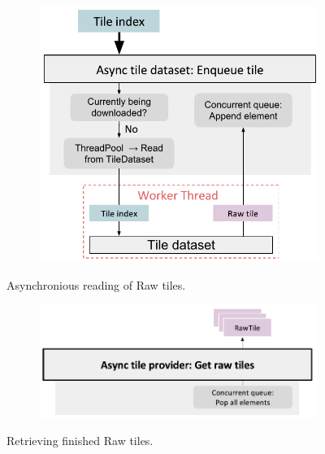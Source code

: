\begin{figure}[htbp]
    \centering
    \begin{subfigure}[bt]{0.6\textwidth}
        \includegraphics[width=\textwidth]{figures/implementation/pipeline/asynctiledataset.pdf}
    \end{subfigure}
    \caption{Asynchronious reading of Raw tiles.}
    \label{fig:asynctiledataset}
\end{figure}

\begin{figure}[htbp]
    \centering
    \begin{subfigure}[bt]{0.6\textwidth}
        \includegraphics[width=\textwidth]{figures/implementation/pipeline/asynctiledataset_gettiles.pdf}
    \end{subfigure}
    \caption{Retrieving finished Raw tiles.}
    \label{fig:asynctiledataset2}
\end{figure}


